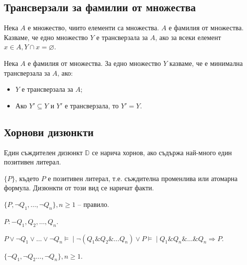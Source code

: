 \documentclass{article}
\newcommand{\mymod}{\models\!\mid}
\begin{document}
\subsection*{Трансверзали за фамилии от множества}

\begin{mydef}[Трансверзала]
Нека $A$ е множество, чиито елементи са множества. $A$ е фамилия от множества. Казваме, че едно множество $Y$ е трансверзала за $A$, ако за всеки елемент $x \in A, Y \cap x = \varnothing$.
\end{mydef}

\begin{mydef}
Нека $A$ е фамилия от множества. За едно множество $Y$ казваме, че е минимална трансверзала за $A$, ако:
\begin{itemize}
\item $Y$ е трансверзала за $A$;
\item Ако $Y' \subseteq Y$ и $Y'$ е трансверзала, то $Y' = Y$.
\end{itemize}
\end{mydef}

\subsection*{Хорнови дизюнкти}

\begin{mydef}
Един съждителен дизюнкт $\mathbb{D}$ се нарича хорнов, ако съдържа най-много един позитивен литерал.
\end{mydef}

\begin{mydef}[Факт]
$\{P\}$, където $P$ е позитивен литерал, т.е. съждителна променлива или атомарна формула. Дизюнкти от този вид се наричат факти.
\end{mydef}


\begin{mydef}[Правило]
$\{P, \neg Q_1, \ldots, \neg Q_n\}, n \geq 1$ -- правило.

$P :- Q_1, Q_2, \ldots, Q_n$.

$P \lor \neg Q_1\lor \ldots \lor \neg Q_n \mymod \neg(Q_1\&Q_2\&\ldots Q_n) \lor P \mymod Q_1\&Q_n\&\ldots\& Q_n \Rightarrow P$.
\end{mydef}

\begin{mydef}[Цели]
$\{\neg Q_1, \neg Q_2 \ldots , \neg Q_n\}, n \geq 1$.
\end{mydef}
\end{document}

